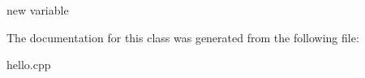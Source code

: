 new variable 

The documentation for this class was generated from the following file\-:\begin{DoxyCompactItemize}
\item 
hello.\-cpp\end{DoxyCompactItemize} 









